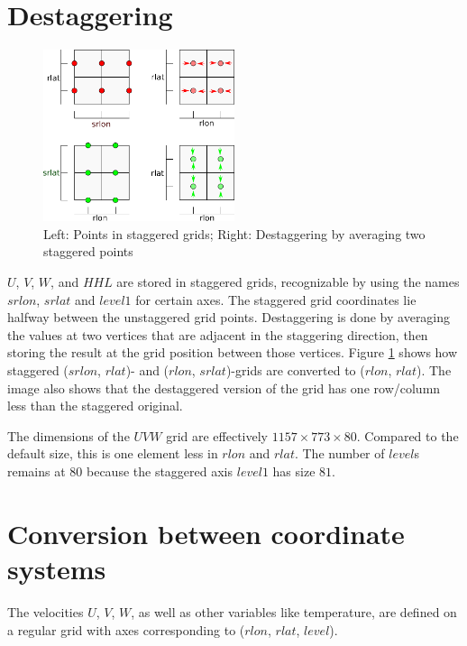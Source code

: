 \section{Destaggering}\label{sec:destaggering}
\begin{figure}
\centering \includegraphics*[width=0.5\textwidth]{figures/0613_staggering}
\caption{Left: Points in staggered grids; Right: Destaggering by averaging two staggered points}
\label{fig:destaggering}
\end{figure}
$U$, $V$, $W$, and $HHL$ are stored in staggered grids, recognizable by using the names $srlon$, $srlat$ and $level1$ for certain axes. The staggered grid coordinates lie halfway between the unstaggered grid points. Destaggering is done by averaging the values at two vertices that are adjacent in the staggering direction, then storing the result at the grid position between those vertices. Figure \ref{fig:destaggering} shows how staggered ($srlon$, $rlat$)- and ($rlon$, $srlat$)-grids are converted to ($rlon$, $rlat$). The image also shows that the destaggered version of the grid has one row/column less than the staggered original.

The dimensions of the $UVW$ grid are effectively $1157 \times 773 \times 80$. Compared to the default size, this is one element less in $rlon$ and $rlat$. The number of $level$s remains at $80$ because the staggered axis $level1$ has size $81$.%

\section{Conversion between coordinate systems}\label{sec:conversion}
The velocities $U$, $V$, $W$, as well as other variables like temperature, are defined on a regular grid with axes corresponding to ($rlon$, $rlat$, $level$).

